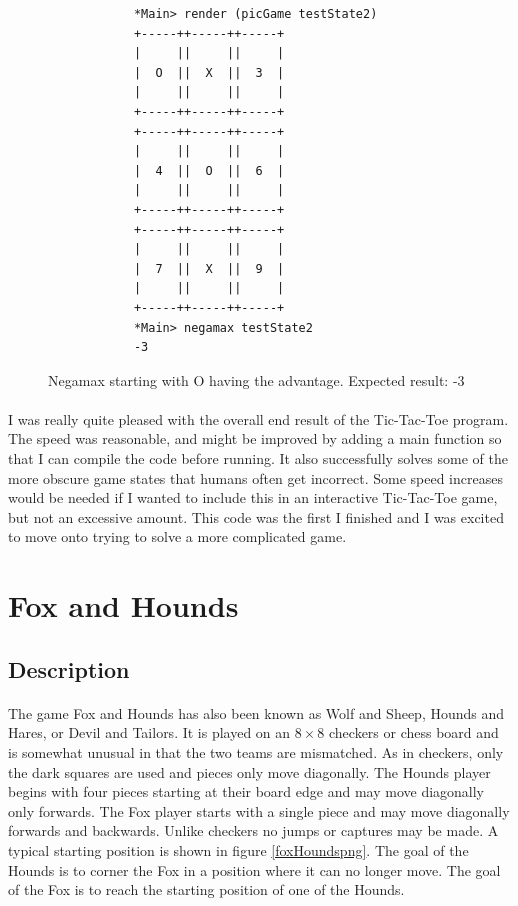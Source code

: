 \documentclass[10pt]{article}
\begin{document}
    \begin{figure}[ht]
        \centering
        \begin{verbatim}
            *Main> render (picGame testState2)
            +-----++-----++-----+
            |     ||     ||     |
            |  O  ||  X  ||  3  |
            |     ||     ||     |
            +-----++-----++-----+
            +-----++-----++-----+
            |     ||     ||     |
            |  4  ||  O  ||  6  |
            |     ||     ||     |
            +-----++-----++-----+
            +-----++-----++-----+
            |     ||     ||     |
            |  7  ||  X  ||  9  |
            |     ||     ||     |
            +-----++-----++-----+
            *Main> negamax testState2
            -3    \end{verbatim}
        \caption{Negamax starting with O having the advantage.  Expected result: -3}\label{tttO}
    \end{figure}

    \paragraph{} I was really quite pleased with the overall end result of the 
    Tic-Tac-Toe program.  The speed was reasonable, and might be improved by 
    adding a main function so that I can compile the code before running.  It also
    successfully solves some of the more obscure game states that humans often 
    get incorrect.  Some speed increases would be needed if I wanted to include 
    this in an interactive Tic-Tac-Toe game, but not an excessive amount.  This
    code was the first I finished and I was excited to move onto trying to solve
    a more complicated game.

\clearpage
\section{Fox and Hounds}
\subsection{Description}
    \paragraph{} The game Fox and Hounds has also been known as Wolf and Sheep, 
    Hounds and Hares, or Devil and Tailors.  It is played on an $8 \times 8$
    checkers or chess board and is somewhat unusual in that the two teams are 
    mismatched.  As in checkers, only the dark squares are used and pieces
    only move diagonally.  The Hounds player begins with four pieces starting 
    at their board edge and may move diagonally only forwards.  The Fox player 
    starts with a single piece and may move diagonally forwards and backwards.
    Unlike checkers no jumps or captures may be made.  A typical starting position
    is shown in figure \ref{foxHoundspng}.  The goal of the Hounds is to corner the
    Fox in a position where it can no longer move.  The goal of the Fox is to 
    reach the starting position of one of the Hounds.
\end{document}
